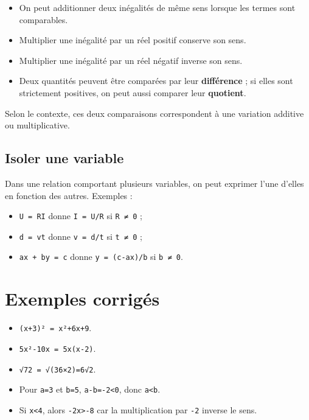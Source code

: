 \begin{itemize}
\item On peut additionner deux inégalités de même sens lorsque les termes sont comparables.
\item Multiplier une inégalité par un réel positif conserve son sens.
\item Multiplier une inégalité par un réel négatif inverse son sens.
\item Deux quantités peuvent être comparées par leur \textbf{différence} ; si elles sont strictement positives, on peut aussi comparer leur \textbf{quotient}.
\end{itemize}

Selon le contexte, ces deux comparaisons correspondent à une variation additive ou multiplicative.

\subsection{Isoler une variable}

Dans une relation comportant plusieurs variables, on peut exprimer l'une d'elles en fonction des autres. Exemples :

\begin{itemize}
\item \texttt{U = RI} donne \texttt{I = U/R} si \texttt{R ≠ 0} ;
\item \texttt{d = vt} donne \texttt{v = d/t} si \texttt{t ≠ 0} ;
\item \texttt{ax + by = c} donne \texttt{y = (c-ax)/b} si \texttt{b ≠ 0}.
\end{itemize}

\section{Exemples corrigés}

\begin{itemize}
\item \texttt{(x+3)² = x²+6x+9}.
\item \texttt{5x²-10x = 5x(x-2)}.
\item \texttt{√72 = √(36×2)=6√2}.
\item Pour \texttt{a=3} et \texttt{b=5}, \texttt{a-b=-2<0}, donc \texttt{a<b}.
\item Si \texttt{x<4}, alors \texttt{-2x>-8} car la multiplication par \texttt{-2} inverse le sens.
\end{itemize}


